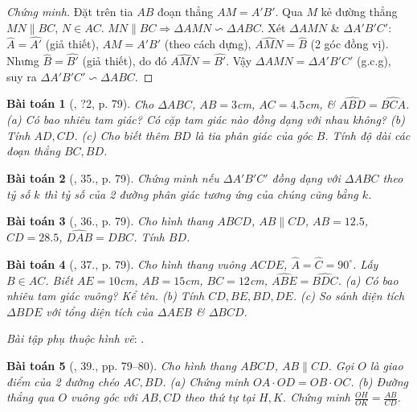 \documentclass{article}
\newtheorem{baitoan}{Bài toán}
\begin{document}
\begin{proof}[Chứng minh]
	Đặt trên tia $AB$ đoạn thẳng $AM = A'B'$. Qua $M$ kẻ đường thẳng $MN\parallel BC$, $N\in AC$. $MN\parallel BC\Rightarrow\Delta AMN\backsim\Delta ABC$. Xét $\Delta AMN$ \& $\Delta A'B'C'$: $\widehat{A} = \widehat{A'}$ (giả thiết), $AM = A'B'$ (theo cách dựng), $\widehat{AMN} = \widehat{B}$ (2 góc đồng vị). Nhưng $\widehat{B} = \widehat{B'}$ (giả thiết), do đó $\widehat{AMN} = \widehat{B'}$. Vậy $\Delta AMN = \Delta A'B'C'$ (g.c.g), suy ra $\Delta A'B'C'\backsim\Delta ABC$.
\end{proof}

\begin{baitoan}[\cite{SGK_Toan_8_tap_2}, ?2, p. 79]
	Cho $\Delta ABC$, $AB = 3$\emph{cm}, $AC = 4.5$\emph{cm}, \& $\widehat{ABD} = \widehat{BCA}$. (a) Có bao nhiêu tam giác? Có cặp tam giác nào đồng dạng với nhau không? (b) Tính $AD,CD$. (c) Cho biết thêm $BD$ là tia phân giác của góc $B$. Tính độ dài các đoạn thẳng $BC,BD$.
\end{baitoan}

\begin{baitoan}[\cite{SGK_Toan_8_tap_2}, 35., p. 79]
	Chứng minh nếu $\Delta A'B'C'$ đồng dạng với $\Delta ABC$ theo tỷ số $k$ thì tỷ số của 2 đường phân giác tương ứng của chúng cũng bằng $k$.
\end{baitoan}

\begin{baitoan}[\cite{SGK_Toan_8_tap_2}, 36., p. 79]
	Cho hình thang $ABCD$, $AB\parallel CD$, $AB = 12.5$, $CD = 28.5$, $\widehat{DAB} = \widehat{DBC}$. Tính $BD$.
\end{baitoan}

\begin{baitoan}[\cite{SGK_Toan_8_tap_2}, 37., p. 79]
	Cho hình thang vuông $ACDE$, $\widehat{A} = \widehat{C} = 90^\circ$. Lấy $B\in AC$. Biết $AE = 10$\emph{cm}, $AB = 15$\emph{cm}, $BC = 12$\emph{cm}, $\widehat{ABE} = \widehat{BDC}$. (a) Có bao nhiêu tam giác vuông? Kể tên. (b) Tính $CD,BE,BD,DE$. (c) So sánh diện tích $\Delta BDE$ với tổng diện tích của $\Delta AEB$ \& $\Delta BCD$.
\end{baitoan}
\noindent\textit{Bài tập phụ thuộc hình vẽ}: \cite[38., p. 79]{SGK_Toan_8_tap_2}.

\begin{baitoan}[\cite{SGK_Toan_8_tap_2}, 39., pp. 79--80]
	Cho hình thang $ABCD$, $AB\parallel CD$. Gọi $O$ là giao điểm của 2 đường chéo $AC,BD$. (a) Chứng minh $OA\cdot OD = OB\cdot OC$. (b) Đường thẳng qua $O$ vuông góc với $AB,CD$ theo thứ tự tại $H,K$. Chứng minh $\frac{OH}{OK} = \frac{AB}{CD}$.
\end{baitoan}
\end{document}
